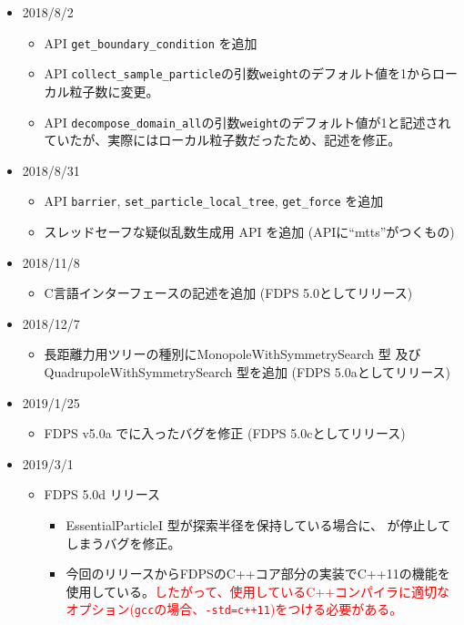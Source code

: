 \begin{itemize}[leftmargin=*,itemsep=-1ex]
\item 2018/8/2
\begin{itemize}
\item API \texttt{get\_boundary\_condition} を追加
\item API \texttt{collect\_sample\_particle}の引数\texttt{weight}のデフォルト値を1からローカル粒子数に変更。
\item API \texttt{decompose\_domain\_all}の引数\texttt{weight}のデフォルト値が1と記述されていたが、実際にはローカル粒子数だったため、記述を修正。
\end{itemize}

\item 2018/8/31
\begin{itemize}
\item API \texttt{barrier}, \texttt{set\_particle\_local\_tree}, \texttt{get\_force} を追加
\item スレッドセーフな疑似乱数生成用 API を追加 (APIに``mtts''がつくもの)
\end{itemize}

\item 2018/11/8
\begin{itemize}
\item C言語インターフェースの記述を追加 (FDPS 5.0としてリリース)
\end{itemize}

\item 2018/12/7
\begin{itemize}
\item 長距離力用ツリーの種別にMonopoleWithSymmetrySearch 型 及び QuadrupoleWithSymmetrySearch 型を追加 (FDPS 5.0aとしてリリース)
\end{itemize}

\item 2019/1/25
\begin{itemize}
\item FDPS v5.0a でに入ったバグを修正 (FDPS 5.0cとしてリリース)
\end{itemize}

\item 2019/3/1
\begin{itemize}
\item FDPS 5.0d リリース
\begin{itemize}
\item EssentialParticleI 型が探索半径を保持している場合に、 が停止してしまうバグを修正。
\item 今回のリリースからFDPSのC++コア部分の実装でC++11の機能を使用している。\textcolor{red}{したがって、使用しているC++コンパイラに適切なオプション(\texttt{gcc}の場合、\texttt{-std=c++11})をつける必要がある。}
\end{itemize}
\end{itemize}


\end{itemize}
